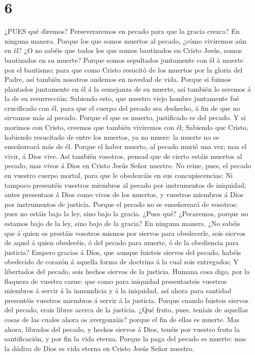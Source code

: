 \hypertarget{section-5}{%
\section{6}\label{section-5}}

 ¿PUES qué diremos? Perseveraremos en pecado para que la
gracia crezca?  En ninguna manera. Porque los que somos
muertos al pecado, ¿cómo viviremos aún en él?  ¿O no sabéis
que todos los que somos bautizados en Cristo Jesús, somos bautizados en
su muerte?  Porque somos sepultados juntamente con él á
muerte por el bautismo; para que como Cristo resucitó de los muertos por
la gloria del Padre, así también nosotros andemos en novedad de vida.
 Porque si fuimos plantados juntamente en él á la semejanza
de su muerte, así también lo seremos á la de su resurrección:
 Sabiendo esto, que nuestro viejo hombre juntamente fué
crucificado con él, para que el cuerpo del pecado sea deshecho, á fin de
que no sirvamos más al pecado.  Porque el que es muerto,
justificado es del pecado.  Y si morimos con Cristo, creemos
que también viviremos con él;  Sabiendo que Cristo, habiendo
resucitado de entre los muertos, ya no muere: la muerte no se
enseñoreará más de él.  Porque el haber muerto, al pecado
murió una vez; mas el vivir, á Dios vive.  Así también
vosotros, pensad que de cierto estáis muertos al pecado, mas vivos á
Dios en Cristo Jesús Señor nuestro.  No reine, pues, el
pecado en vuestro cuerpo mortal, para que le obedezcáis en sus
concupiscencias;  Ni tampoco presentéis vuestros miembros
al pecado por instrumentos de iniquidad; antes presentaos á Dios como
vivos de los muertos, y vuestros miembros á Dios por instrumentos de
justicia.  Porque el pecado no se enseñoreará de vosotros;
pues no estáis bajo la ley, sino bajo la gracia.  ¿Pues
qué? ¿Pecaremos, porque no estamos bajo de la ley, sino bajo de la
gracia? En ninguna manera.  ¿No sabéis que á quien os
prestáis vosotros mismos por siervos para obedecerle, sois siervos de
aquel á quien obedecéis, ó del pecado para muerte, ó de la obediencia
para justicia?  Empero gracias á Dios, que aunque fuisteis
siervos del pecado, habéis obedecido de corazón á aquella forma de
doctrina á la cual sois entregados;  Y libertados del
pecado, sois hechos siervos de la justicia.  Humana cosa
digo, por la flaqueza de vuestra carne: que como para iniquidad
presentasteis vuestros miembros á servir á la inmundicia y á la
iniquidad, así ahora para santidad presentéis vuestros miembros á servir
á la justicia.  Porque cuando fuisteis siervos del pecado,
erais libres acerca de la justicia.  ¿Qué fruto, pues,
teníais de aquellas cosas de las cuales ahora os avergonzáis? porque el
fin de ellas es muerte.  Mas ahora, librados del pecado, y
hechos siervos á Dios, tenéis por vuestro fruto la santificación, y por
fin la vida eterna.  Porque la paga del pecado es muerte:
mas la dádiva de Dios es vida eterna en Cristo Jesús Señor nuestro.


